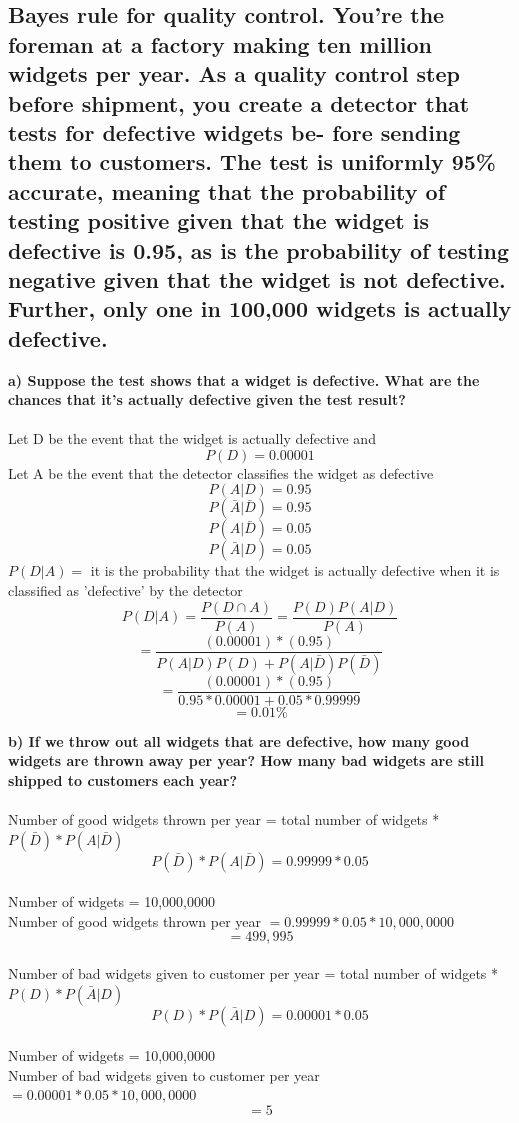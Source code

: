 \documentclass[11pt,letterpaper]{article}
\begin{document}
\subsection{Bayes rule for quality control. You’re the foreman at a factory making ten million widgets per year. As a quality control step before shipment, you create a detector that tests for defective widgets be- fore sending them to customers. The test is uniformly 95\% accurate, meaning that the probability of testing positive given that the widget is defective is 0.95, as is the probability of testing negative given that the widget is not defective. Further, only one in 100,000 widgets is actually defective.}
\textbf{a) Suppose the test shows that a widget is defective. What are the chances that it’s actually defective given the test result?} \\\\
Let D be the event that the widget is actually defective and 
$$ P(D) = 0.00001 $$
Let A be the event that the detector classifies the widget as defective
$$ P(A|D) = 0.95 $$
$$ P(\bar{A}|\bar{D}) = 0.95 $$
$$ P(A|\bar{D}) = 0.05 $$
$$ P(\bar{A}|{D}) = 0.05 $$
$ P(D|A) = $ it is the probability that the widget is actually defective when it is classified as  'defective' by the detector
$$ P(D|A) = \frac{P(D\cap A)}{P(A)} = \frac{P(D)P(A|D)}{P(A)} $$
$$ = \frac{(0.00001) * (0.95)}{P(A|D)P(D) + P(A|\bar{D}) P(\bar{D})} $$
$$ = \frac{(0.00001) * (0.95)}{0.95*0.00001 + 0.05*0.99999} $$
$$ = 0.01\% $$

\textbf{b) If we throw out all widgets that are defective, how many good widgets are thrown away per year? How many bad widgets are still shipped to customers each year?} \\\\
Number of good widgets thrown per year = total number of widgets *$ P(\bar{D})* P(A|\bar{D})$\\
$$ P(\bar{D})*P(A|\bar{D}) = 0.99999 * 0.05 $$\\
Number of widgets = 10,000,0000 \\
Number of good widgets thrown per year $= 0.99999 * 0.05 * 10,000,0000$\\
$$= 499,995$$\\
Number of bad widgets given to customer per year = total number of widgets *$ P(D)* P(\bar{A}|D)$\\
$$ P(D)* P(\bar{A}|D) = 0.00001 * 0.05 $$\\
Number of widgets = 10,000,0000 \\
Number of bad widgets given to customer per year $= 0.00001 * 0.05 * 10,000,0000$\\
$$= 5$$
\end{document}
